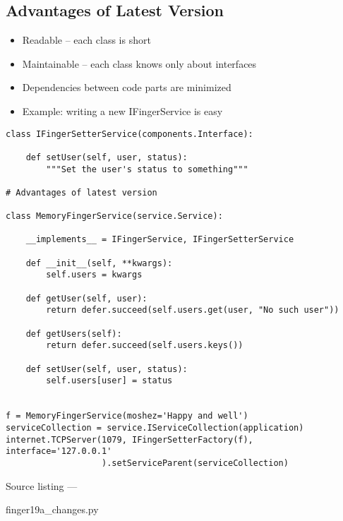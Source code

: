 \subsection{Advantages of Latest Version}
\begin{itemize}
\item Readable -- each class is short
\item Maintainable -- each class knows only about interfaces
\item Dependencies between code parts are minimized
\item Example: writing a new IFingerService is easy
\end{itemize}
\begin{verbatim}
class IFingerSetterService(components.Interface):

    def setUser(self, user, status):
        """Set the user's status to something"""

# Advantages of latest version

class MemoryFingerService(service.Service):

    __implements__ = IFingerService, IFingerSetterService

    def __init__(self, **kwargs):
        self.users = kwargs

    def getUser(self, user):
        return defer.succeed(self.users.get(user, "No such user"))

    def getUsers(self):
        return defer.succeed(self.users.keys())

    def setUser(self, user, status):
        self.users[user] = status


f = MemoryFingerService(moshez='Happy and well')
serviceCollection = service.IServiceCollection(application)
internet.TCPServer(1079, IFingerSetterFactory(f), interface='127.0.0.1'
                   ).setServiceParent(serviceCollection)
\end{verbatim}\parbox[b]{\linewidth}{\begin{center}Source listing --- \begin{em}finger19a\_changes.py\end{em}\end{center}}

